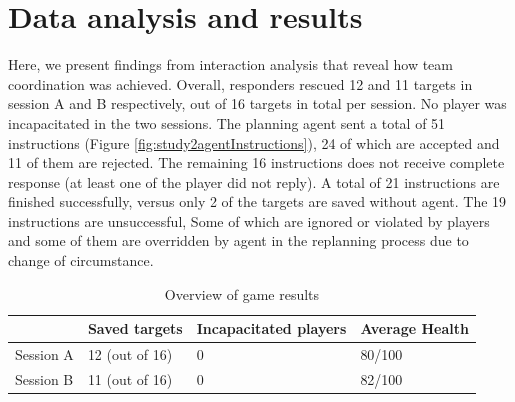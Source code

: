 
\section{Data analysis and results}\label{sec:study2analysis}
Here, we present findings from interaction analysis that reveal how team coordination was achieved. Overall, responders rescued 12 and 11 targets in session A and B respectively, out of 16 targets in total per session. No player was incapacitated in the two sessions. The planning agent sent a total of 51 instructions (Figure \ref{fig:study2agentInstructions}), 24 of which are accepted and 11 of them are rejected. The remaining 16 instructions does not receive complete response (at least one of the player did not reply). A total of 21 instructions are finished successfully, versus only 2 of the targets are saved without agent. The 19 instructions are unsuccessful, Some of which are ignored or violated by players and some of them are overridden by agent in the replanning process due to change of circumstance.\\

\begin{table}[h]
\footnotesize
\begin{tabular}{llll}
\multicolumn{1}{l|}{} & Saved targets & Incapacitated players & Average Health \\ \hline
\multicolumn{1}{l|}{Session A} & 12 (out of 16) & 0                    & 80/100             \\ 
\multicolumn{1}{l|}{Session B} & 11 (out of 16) & 0                    & 82/100             \\ 
\end{tabular}
\caption{Overview of game results}
\label{tab:gameResults1}
\end{table}

